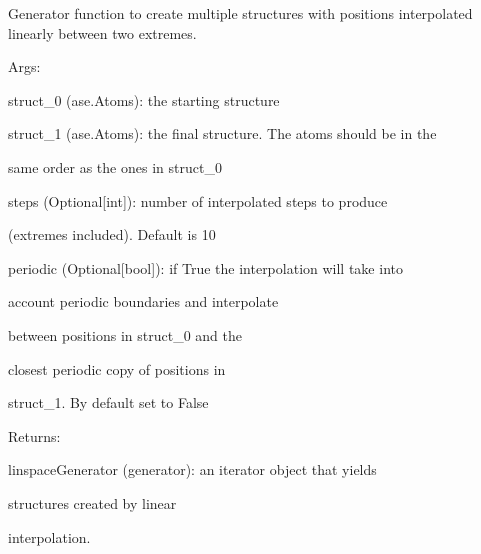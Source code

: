 \documentclass[letterpaper,10pt,english]{sphinxmanual}
\begin{document}
\begin{fulllineitems}
\label{doctree/soprano.collection.generate.linspace:soprano.collection.generate.linspace.linspaceGen}
Generator function to create multiple structures with positions
interpolated linearly between two extremes.

\begin{DUlineblock}{0em}
\item[] Args:
\item[]
\begin{DUlineblock}{\DUlineblockindent}
\item[] struct\_0 (ase.Atoms): the starting structure
\item[] struct\_1 (ase.Atoms): the final structure. The atoms should be in the
\item[]
\begin{DUlineblock}{\DUlineblockindent}
\item[] same order as the ones in struct\_0
\end{DUlineblock}
\item[] steps (Optional{[}int{]}): number of interpolated steps to produce
\item[]
\begin{DUlineblock}{\DUlineblockindent}
\item[] (extremes included). Default is 10
\end{DUlineblock}
\item[] periodic (Optional{[}bool{]}): if True the interpolation will take into
\item[]
\begin{DUlineblock}{\DUlineblockindent}
\item[] account periodic boundaries and interpolate
\item[] between positions in struct\_0 and the
\item[] closest periodic copy of positions in
\item[] struct\_1. By default set to False
\end{DUlineblock}
\end{DUlineblock}
\end{DUlineblock}

\begin{DUlineblock}{0em}
\item[] Returns:
\item[]
\begin{DUlineblock}{\DUlineblockindent}
\item[] linspaceGenerator (generator): an iterator object that yields
\item[]
\begin{DUlineblock}{\DUlineblockindent}
\item[] structures created by linear
\item[] interpolation.
\end{DUlineblock}
\end{DUlineblock}
\end{DUlineblock}

\end{fulllineitems}
\end{document}
